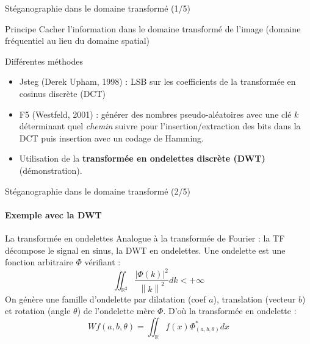 \documentclass{beamer}
\newcommand{\norm}[1]{\left\lVert#1\right\rVert}
\newcommand{\abs}[1]{\left\lvert#1\right\rvert}
\begin{document}
	\begin{frame}{Stéganographie dans le domaine transformé (1/5)}
		\begin{alertblock}{Principe}
			Cacher l'information dans le domaine transformé de l'image (domaine fréquentiel au lieu du domaine spatial)
		\end{alertblock}		
		\begin{exampleblock}{Différentes méthodes}
			\begin{itemize}
				\item Jsteg (Derek Upham, 1998) : LSB sur les coefficients de la transformée en cosinus discrète (DCT)
				\item F5 (Westfeld, 2001) : générer des nombres pseudo-aléatoires avec une clé $k$ déterminant quel \textit{chemin} suivre pour l'insertion/extraction des bits dans la DCT puis insertion avec un codage de Hamming.
				\item Utilisation de la \textbf{transformée en ondelettes discrète (DWT)} (démonstration).
			\end{itemize}
		\end{exampleblock}
	\end{frame}
	
	\begin{frame}{Stéganographie dans le domaine transformé (2/5)}
		\framesubtitle{Exemple avec la DWT}
		\begin{block}{La transformée en ondelettes}
			Analogue à la transformée de Fourier : la TF décompose le signal en sinus, la DWT en ondelettes. Une ondelette est une fonction arbitraire $\Phi$ vérifiant :
			$$ \iint_{\mathbb{R}^2} \frac{\abs{\Phi(k)}^2}{\norm{k}^2}dk < +\infty $$
			On génère une famille d'ondelette par dilatation (coef $a$), translation (vecteur $b$) et rotation (angle $\theta$) de l'ondelette mère $\Phi$. D'où la transformée en ondelette :
			$$Wf(a,b,\theta)=\iint_{\mathbb{R}}f(x)\Phi_{(a,b,\theta)}^{*}dx$$
		\end{block}
	\end{frame}
\end{document}

